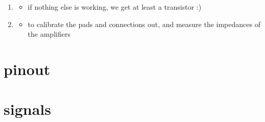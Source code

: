 \documentclass[letterpaper,10pt,english]{sphinxmanual}
\begin{document}
\begin{enumerate}
\item {} \begin{description}
\begin{itemize}
\item {} 
\sphinxAtStartPar
if nothing else is working, we get at least a transistor :)

\end{itemize}

\end{description}

\item {} \begin{description}
\begin{itemize}
\item {} 
\sphinxAtStartPar
to calibrate the pads and connections out, and measure the impedances of the amplifiers

\end{itemize}

\end{description}

\end{enumerate}


\section{pinout}
\label{\detokenize{specification:pinout}}


\section{signals}
\label{\detokenize{specification:signals}}
\end{document}
